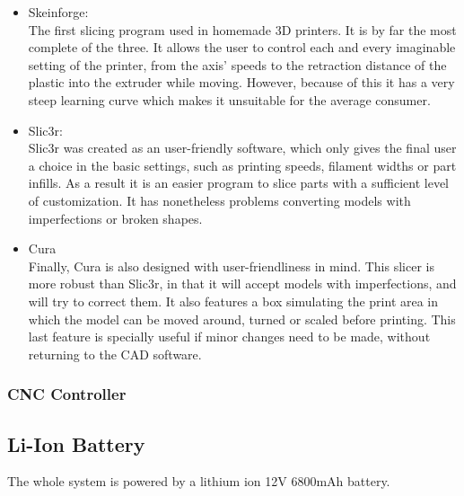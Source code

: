 		\begin{itemize}
		  
		  \item Skeinforge: \hfill \\
		  The first slicing program used in homemade 3D printers. It is by far the most complete of the three. It allows the user to control each and every imaginable setting of the printer, from the axis' speeds to the retraction distance of the plastic into the extruder while moving. However, because of this it has a very steep learning curve which makes it unsuitable for the average consumer.

		  \item Slic3r:  \hfill \\
		  Slic3r was created as an user-friendly software, which only gives the final user a choice in the basic settings, such as printing speeds, filament widths or part infills. As a result it is an easier program to slice parts with a sufficient level of customization. It has nonetheless problems converting models with imperfections or broken shapes.
		  
		  \item Cura \hfill \\
		  Finally, Cura is also designed with user-friendliness in mind. This slicer is more robust than Slic3r, in that it will accept models with imperfections, and will try to correct them. It also features a box simulating the print area in which the model can be moved around, turned or scaled before printing.
		  This last feature is specially useful if minor changes need to be made, without returning to the CAD software.
		
		\end{itemize}



	\subsubsection{CNC Controller}




\subsection{Li-Ion Battery}

The whole system is powered by a lithium ion 12V 6800mAh battery. 


